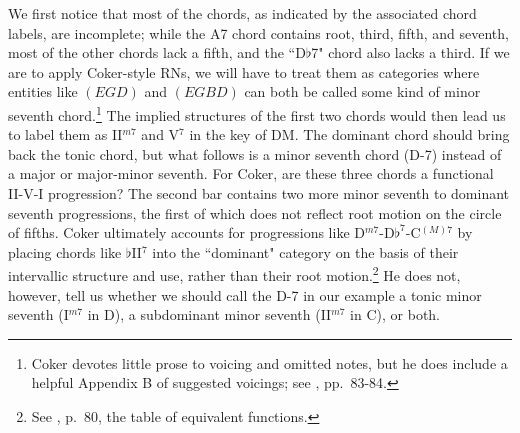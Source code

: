 We first notice that most of the chords, as indicated by the associated chord labels, are incomplete; while the A7 chord contains root, third, fifth, and seventh, most of the other chords lack a fifth, and the ``D$\flat$7" chord also lacks a third.  If we are to apply Coker-style RNs, we will have to treat them as categories where entities like $(EGD)$ and $(EGBD)$ can both be called some kind of minor seventh chord.\footnote{Coker devotes little prose to voicing and omitted notes, but he does include a helpful Appendix B of suggested voicings; see \cite{coker1964}, pp.\ 83-84.}  The implied structures of the first two chords would then lead us to label them as II$^{m7}$ and V$^7$ in the key of DM.  The dominant chord should bring back the tonic chord, but what follows is a minor seventh chord (D-7) instead of a major or major-minor seventh.  For Coker, are these three chords a functional II-V-I progression?  The second bar contains two more minor seventh to dominant seventh progressions, the first of which does not reflect root motion on the circle of fifths.  Coker ultimately accounts for progressions like D$^{m7}$-D$\flat^7$-C$^{(M)7}$ by placing chords like $\flat$II$^7$ into the ``dominant" category on the basis of their intervallic structure and use, rather than their root motion.\footnote{See \cite{coker1964}, p.\ 80, the table of equivalent functions.}  He does not, however, tell us whether we should call the D-7 in our example a tonic minor seventh (I$^{m7}$ in D), a subdominant minor seventh (II$^{m7}$ in C), or both.

